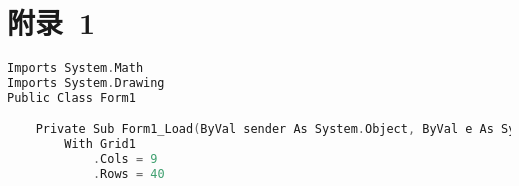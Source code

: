 \newpage

\section*{\hspace*{\fill}附录\ 1\hspace*{\fill}}

\begin{lstlisting}[language = C]
Imports System.Math
Imports System.Drawing
Public Class Form1

	Private Sub Form1_Load(ByVal sender As System.Object, ByVal e As System.EventArgs) Handles MyBase.Load
		With Grid1
			.Cols = 9
			.Rows = 40

\end{lstlisting}